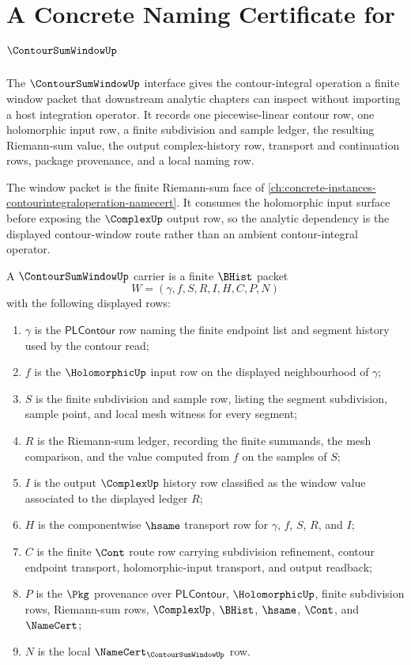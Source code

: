 \chapter{A Concrete Naming Certificate for $\ContourSumWindowUp$}
\label{ch:concrete-instances-contoursumwindow-namecert}

The $\ContourSumWindowUp$ interface gives the contour-integral operation a finite window packet that downstream analytic chapters can inspect without importing a host integration operator. It records one piecewise-linear contour row, one holomorphic input row, a finite subdivision and sample ledger, the resulting Riemann-sum value, the output complex-history row, transport and continuation rows, package provenance, and a local naming row.

The window packet is the finite Riemann-sum face of \autoref{ch:concrete-instances-contourintegraloperation-namecert}. It consumes the holomorphic input surface before exposing the $\ComplexUp$ output row, so the analytic dependency is the displayed contour-window route rather than an ambient contour-integral operator.

\begin{definition}
\label{def:contour-sum-window-carrier}
A $\ContourSumWindowUp$ carrier is a finite $\BHist$ packet
$$
W=(\gamma,f,S,R,I,H,C,P,N)
$$
with the following displayed rows:
\begin{enumerate}
\item $\gamma$ is the $\mathsf{PLContour}$ row naming the finite endpoint list and segment history used by the contour read;
\item $f$ is the $\HolomorphicUp$ input row on the displayed neighbourhood of $\gamma$;
\item $S$ is the finite subdivision and sample row, listing the segment subdivision, sample point, and local mesh witness for every segment;
\item $R$ is the Riemann-sum ledger, recording the finite summands, the mesh comparison, and the value computed from $f$ on the samples of $S$;
\item $I$ is the output $\ComplexUp$ history row classified as the window value associated to the displayed ledger $R$;
\item $H$ is the componentwise $\hsame$ transport row for $\gamma$, $f$, $S$, $R$, and $I$;
\item $C$ is the finite $\Cont$ route row carrying subdivision refinement, contour endpoint transport, holomorphic-input transport, and output readback;
\item $P$ is the $\Pkg$ provenance over $\mathsf{PLContour}$, $\HolomorphicUp$, finite subdivision rows, Riemann-sum rows, $\ComplexUp$, $\BHist$, $\hsame$, $\Cont$, and $\NameCert$;
\item $N$ is the local $\NameCert_{\ContourSumWindowUp}$ row.
\end{enumerate}
\end{definition}

